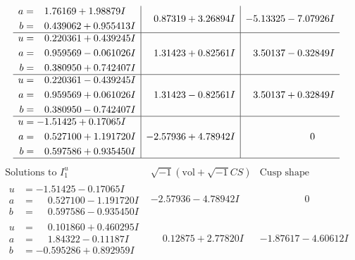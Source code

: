 \documentclass[1p]{elsarticle_modified}
\theoremstyle{definition}
\newcommand{\I}{\sqrt{-1}}
\begin{document}
$$\begin{array}{c|c|c}
\begin{aligned}
a &= \phantom{-}1.76169 + 1.98879 I \\
b &= \phantom{-}0.439062 + 0.955413 I\end{aligned}
 & \phantom{-}0.87319 + 3.26894 I & -5.13325 - 7.07926 I \\ \hline\begin{aligned}
u &= \phantom{-}0.220361 + 0.439245 I \\
a &= \phantom{-}0.959569 - 0.061026 I \\
b &= \phantom{-}0.380950 + 0.742407 I\end{aligned}
 & \phantom{-}1.31423 + 0.82561 I & \phantom{-}3.50137 - 0.32849 I \\ \hline\begin{aligned}
u &= \phantom{-}0.220361 - 0.439245 I \\
a &= \phantom{-}0.959569 + 0.061026 I \\
b &= \phantom{-}0.380950 - 0.742407 I\end{aligned}
 & \phantom{-}1.31423 - 0.82561 I & \phantom{-}3.50137 + 0.32849 I \\ \hline\begin{aligned}
u &= -1.51425 + 0.17065 I \\
a &= \phantom{-}0.527100 + 1.191720 I \\
b &= \phantom{-}0.597586 + 0.935450 I\end{aligned}
 & -2.57936 + 4.78942 I & \phantom{-0.000000 } 0\\
 \hline 
 \end{array}$$\newpage$$\begin{array}{c|c|c}  
\text{Solutions to }I^u_{1}& \I (\text{vol} + \sqrt{-1}CS) & \text{Cusp shape}\\
 \hline 
\begin{aligned}
u &= -1.51425 - 0.17065 I \\
a &= \phantom{-}0.527100 - 1.191720 I \\
b &= \phantom{-}0.597586 - 0.935450 I\end{aligned}
 & -2.57936 - 4.78942 I & \phantom{-0.000000 } 0 \\ \hline\begin{aligned}
u &= \phantom{-}0.101860 + 0.460295 I \\
a &= \phantom{-}1.84322 - 0.11187 I \\
b &= -0.595286 + 0.892959 I\end{aligned}
 & \phantom{-}0.12875 + 2.77820 I & -1.87617 - 4.60612 I \\ \hline\begin{aligned}

\end{aligned}
\end{array}$$
\end{document}

